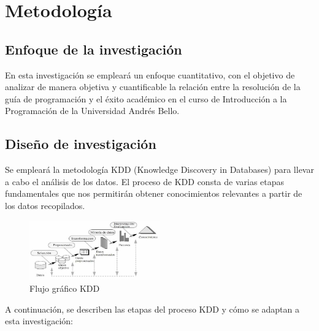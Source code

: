\section{Metodología}\label{Metodología}

\subsection{Enfoque de la investigación}

En esta investigación se empleará un enfoque cuantitativo, con el objetivo de analizar de manera objetiva y cuantificable la relación entre la resolución de la guía de programación y el éxito académico en el curso de Introducción a la Programación de la Universidad Andrés Bello.

\subsection{Diseño de investigación}

Se empleará la metodología KDD (Knowledge Discovery in Databases) para llevar a cabo el análisis de los datos. El proceso de KDD consta de varias etapas fundamentales que nos permitirán obtener conocimientos relevantes a partir de los datos recopilados.

\begin{figure}[H]
  \centering
  \includegraphics[width=0.5\textwidth]{img/KDD.png}
  \caption{Flujo gráfico KDD}
  \label{fig:flujo_kdd}
\end{figure}

A continuación, se describen las etapas del proceso KDD y cómo se adaptan a esta investigación:

